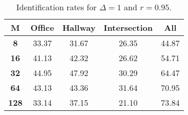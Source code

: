 \begin{table}[h]
    \footnotesize
    \centering
    \begin{tabular}{|c|c|c|c|l|}    
    \hline
    {\bf M} & {\bf Office} & {\bf Hallway} & {\bf Intersection} &     \multicolumn{1}{c|}{{\bf All}} \\ \hline
    {\bf 8} & 33.37 & 31.67 & 26.35 & 44.87 \\ \hline
    {\bf 16} & 41.13 & 42.32 & 26.62 & 54.71 \\ \hline
    {\bf 32} & 44.95 & 47.92 & 30.29 & 64.47 \\ \hline
    {\bf 64} & 43.13 & 43.36 & 31.64 & 70.95 \\ \hline
    {\bf 128} & 33.14 & 37.15 & 21.10 & 73.84 \\ \hline
    \end{tabular}
    \caption{Identification rates for $\Delta = 1$ and $r = 0.95$.}    
    \label{tab:identify_speakers_0.95_mit_19_1}
\end{table}
